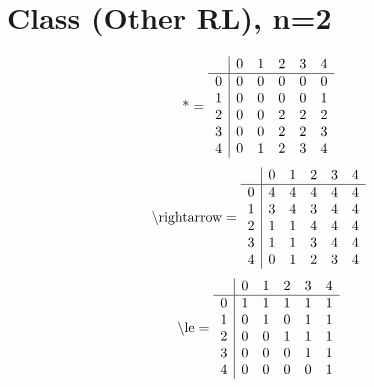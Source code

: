 \documentclass[11pt]{article}
\begin{document}
\section{Class (Other RL), n=2}
\[\text{*} = 
\begin{array}{r | r r r r r}
 & 0 & 1 & 2 & 3 & 4 \\ \hline
0 & 0 & 0 & 0 & 0 & 0 \\
1 & 0 & 0 & 0 & 0 & 1 \\
2 & 0 & 0 & 2 & 2 & 2 \\
3 & 0 & 0 & 2 & 2 & 3 \\
4 & 0 & 1 & 2 & 3 & 4 \\
\end{array}
\]
\[\text{\textbackslash rightarrow} = 
\begin{array}{r | r r r r r}
 & 0 & 1 & 2 & 3 & 4 \\ \hline
0 & 4 & 4 & 4 & 4 & 4 \\
1 & 3 & 4 & 3 & 4 & 4 \\
2 & 1 & 1 & 4 & 4 & 4 \\
3 & 1 & 1 & 3 & 4 & 4 \\
4 & 0 & 1 & 2 & 3 & 4 \\
\end{array}
\]
\[\text{\textbackslash le} = 
\begin{array}{r | r r r r r}
 & 0 & 1 & 2 & 3 & 4 \\ \hline
0 & 1 & 1 & 1 & 1 & 1 \\
1 & 0 & 1 & 0 & 1 & 1 \\
2 & 0 & 0 & 1 & 1 & 1 \\
3 & 0 & 0 & 0 & 1 & 1 \\
4 & 0 & 0 & 0 & 0 & 1 \\
\end{array}
\]
\end{document}
